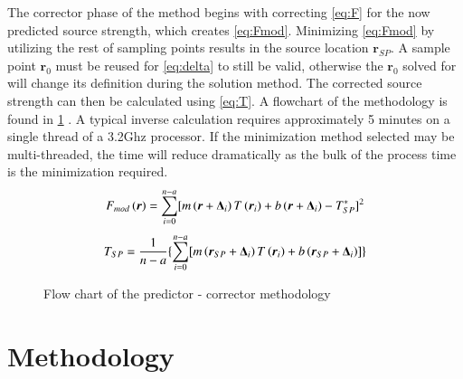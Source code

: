 \documentclass[preprint,12pt]{elsarticle}
\newcommand{\bv}[1]{\boldsymbol #1}  %
\begin{document}
The corrector phase of the method begins with correcting \cref{eq:F} for the now predicted source strength, which creates \cref{eq:Fmod}.  Minimizing \cref{eq:Fmod} by utilizing the rest of sampling points results in the source location $\bv{r_{SP}}$.  A sample point $\bv{r_0}$ must be reused for \cref{eq:delta} to still be valid, otherwise the $\bv{r_0}$ solved for will change its definition during the solution method.  The corrected source strength can then be calculated using \cref{eq:T}.  A flowchart of the methodology is found in \cref{fig:flowchart} \cite{ijhmt1}.  A typical inverse calculation requires approximately 5 minutes on a single thread of a 3.2Ghz processor.  If the minimization method selected may be multi-threaded, the time will reduce dramatically as the bulk of the process time is the minimization required.
%
\begin{equation}
\centering
F_{mod}\left( \bv r \right) = \sum^{n-a}_{i=0} [ m\left( \bv r +\bv{\Delta_i} \right) T\left( \bv{r_i} \right) + b\left( \bv r + \bv{\Delta_i} \right)-T^{\ast}_{SP} ]^2
\label{eq:Fmod}
\end{equation}
%
\begin{equation}
\centering
T_{SP} = \frac{1}{n-a} \{ \sum^{n-a}_{i=0} [ m\left( \bv{r_{SP}}+ \bv{\Delta_i} \right) T\left( \bv{r_i}\right)  + b\left( \bv{r_{SP}}+ \bv{\Delta_i}  \right) ] \}
\label{eq:T}
\end{equation}

\begin{figure}[!tbp]
\centering

\caption{Flow chart of the predictor - corrector methodology \cite{ijhmt1} }
\label{fig:flowchart}
\end{figure}




\section{Methodology}
  
\end{document}
